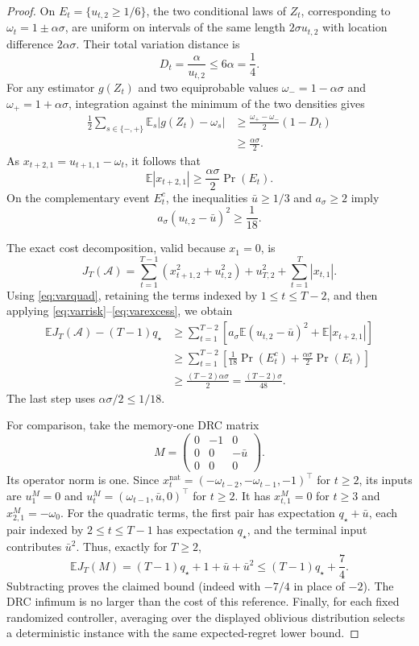 \documentclass[11pt]{article}
\theoremstyle{remark}
\newcommand{\E}{\mathbb E}
\newcommand{\nat}{\mathrm{nat}}
\begin{document}
\begin{proof}
On $E_t=\{u_{t,2}\ge1/6\}$, the two conditional laws of $Z_t$, corresponding
to $\omega_t=1\pm\alpha\sigma$, are uniform on intervals of the same length
$2\sigma u_{t,2}$ with location difference $2\alpha\sigma$.  Their total
variation distance is
\[
 D_t=\frac{\alpha}{u_{t,2}}\le6\alpha=\frac14.
\]
For any estimator $g(Z_t)$ and two equiprobable values
$\omega_-=1-\alpha\sigma$ and $\omega_+=1+\alpha\sigma$, integration
against the minimum of the two densities gives
\begin{align*}
 \frac12\sum_{s\in\{-,+\}}
       \E_s|g(Z_t)-\omega_s|
 &\ge\frac{\omega_+-\omega_-}{2}(1-D_t)\\
 &\ge\frac{\alpha\sigma}{2}.
\end{align*}
As $x_{t+2,1}=u_{t+1,1}-\omega_t$, it follows that
\[
 \E|x_{t+2,1}|\ge\frac{\alpha\sigma}{2}\Pr(E_t).
\tag{A.2}\label{eq:varrisk}
\]
On the complementary event $E_t^c$, the inequalities
$\bar u\ge1/3$ and $a_\sigma\ge2$ imply
\[
 a_\sigma(u_{t,2}-\bar u)^2\ge\frac1{18}.
\tag{A.3}\label{eq:varexcess}
\]

The exact cost decomposition, valid because $x_1=0$, is
\[
 J_T(\mathcal A)
 =\sum_{t=1}^{T-1}(x_{t+1,2}^2+u_{t,2}^2)
     +u_{T,2}^2+\sum_{t=1}^T|x_{t,1}|.
\]
Using \eqref{eq:varquad}, retaining the terms indexed by $1\le t\le T-2$, and then
applying \eqref{eq:varrisk}--\eqref{eq:varexcess}, we obtain
\begin{align*}
 \E J_T(\mathcal A)-(T-1)q_\star
 &\ge\sum_{t=1}^{T-2}
     \left[a_\sigma\E(u_{t,2}-\bar u)^2+\E|x_{t+2,1}|\right]\\
 &\ge\sum_{t=1}^{T-2}
     \left[\frac1{18}\Pr(E_t^c)
           +\frac{\alpha\sigma}{2}\Pr(E_t)\right]\\
 &\ge\frac{(T-2)\alpha\sigma}{2}
   =\frac{(T-2)\sigma}{48}.
\end{align*}
The last step uses $\alpha\sigma/2\le1/18$.

For comparison, take the memory-one DRC matrix
\[
 M=\begin{pmatrix}
     0&-1&0\\
     0&0&-\bar u\\
     0&0&0
   \end{pmatrix}.
\]
Its operator norm is one.  Since
$x_t^{\nat}=(-\omega_{t-2},-\omega_{t-1},-1)^\top$ for $t\ge2$,
its inputs are $u_1^M=0$ and
$u_t^M=(\omega_{t-1},\bar u,0)^\top$ for $t\ge2$.
It has $x_{t,1}^M=0$ for $t\ge3$ and $x_{2,1}^M=-\omega_0$.
For the quadratic terms, the first pair has expectation
$q_\star+\bar u$, each pair indexed by $2\le t\le T-1$ has expectation
$q_\star$, and the terminal input contributes $\bar u^2$.
Thus, exactly for $T\ge2$,
\[
 \E J_T(M)=(T-1)q_\star+1+\bar u+\bar u^2
          \le(T-1)q_\star+\frac74.
\]
Subtracting proves the claimed bound (indeed with $-7/4$ in place of $-2$).
The DRC infimum is no larger than the cost of this reference.  Finally, for each fixed randomized controller, averaging over the
displayed oblivious distribution selects a deterministic instance with the
same expected-regret lower bound.
\end{proof}
\end{document}
